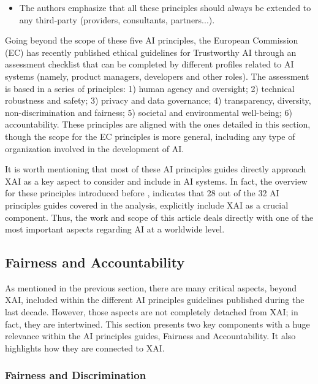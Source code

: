 \documentclass[final]{elsarticle}
\begin{document}
\begin{itemize}[leftmargin=*]
\item The authors emphasize that all these principles should always be extended to any third-party (providers, consultants, partners...).
\end{itemize}

Going beyond the scope of these five AI principles, the European Commission (EC) has recently published ethical guidelines for Trustworthy AI \cite{hleg2019high} through an assessment checklist that can be completed by different profiles related to AI systems (namely, product managers, developers and other roles). The assessment is based in a series of principles: 1) human agency and oversight; 2) technical robustness and safety; 3) privacy and data governance; 4) transparency, diversity, non-discrimination and fairness; 5) societal and environmental well-being; 6) accountability. These principles are aligned with the ones detailed in this section, though the scope for the EC principles is more general, including any type of organization involved in the development of AI. 

It is worth mentioning that most of these AI principles guides directly approach XAI as a key aspect to consider and include in AI systems. In fact, the overview for these principles introduced before \cite{fjeld2019principled}, indicates that 28 out of the 32 AI principles guides covered in the analysis, explicitly include XAI as a crucial component. Thus, the work and scope of this article deals directly with one of the most important aspects regarding AI at a worldwide level.

\subsection{Fairness and Accountability} \label{ssec:fairnessaccount}

As mentioned in the previous section, there are many critical aspects, beyond XAI, included within the different AI principles guidelines published during the last decade. However, those aspects are not completely detached from XAI; in fact, they are intertwined. This section presents two key components with a huge relevance within the AI principles guides, Fairness and Accountability. It also highlights how they are connected to XAI.

\subsubsection{Fairness {\color{black}and Discrimination}} 
\end{document}
